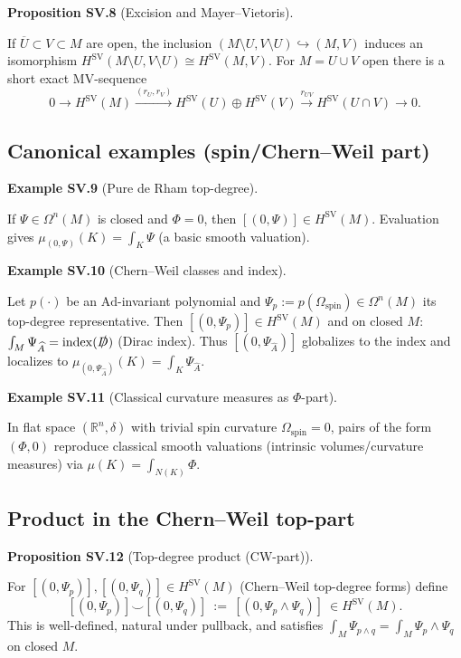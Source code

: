 \documentclass[10pt, letterpaper]{article}
\newcommand{\R}{\mathbb{R}}
\newcommand{\CustomHeading}[3]{%
  \par\medskip\noindent%
  \textbf{#1 #2} \textnormal{(#3)}.\enskip%
}
\newenvironment{PROP}[2]{\begin{unitbox}\CustomHeading{Proposition}{#1}{#2}}{\end{unitbox}}
\newenvironment{EXA}[2]{\begin{unitbox}\CustomHeading{Example}{#1}{#2}}{\end{unitbox}}
\begin{document}
\begin{PROP}{SV.8}{Excision and Mayer--Vietoris}
If $\overline U\subset V\subset M$ are open, the inclusion $(M\setminus U, V\setminus U)\hookrightarrow (M,V)$
induces an isomorphism $H^{\operatorname{SV}}(M\setminus U,V\setminus U)\cong H^{\operatorname{SV}}(M,V)$.
For $M=U\cup V$ open there is a short exact MV-sequence
\[
0\to H^{\operatorname{SV}}(M)\xrightarrow{(r_U,r_V)} H^{\operatorname{SV}}(U)\oplus H^{\operatorname{SV}}(V)\xrightarrow{r_{UV}} H^{\operatorname{SV}}(U\cap V)\to 0.
\]
\end{PROP}

\subsection{Canonical examples (spin/Chern--Weil part)}
\begin{EXA}{SV.9}{Pure de Rham top-degree}
If $\Psi\in\Omega^n(M)$ is closed and $\Phi=0$, then $[(0,\Psi)]\in H^{\operatorname{SV}}(M)$.
Evaluation gives $\mu_{(0,\Psi)}(K)=\int_K\Psi$ (a basic smooth valuation).
\end{EXA}

\begin{EXA}{SV.10}{Chern--Weil classes and index}
Let $p(\cdot)$ be an $\mathrm{Ad}$-invariant polynomial and $\Psi_p:=p(\Omega_{\mathrm{spin}})\in\Omega^n(M)$ its top-degree representative.
Then $[(0,\Psi_p)]\in H^{\operatorname{SV}}(M)$ and on closed $M$:
$\int_M \Psi_{\widehat A}=\mathrm{index}(\slashed{D})$ (Dirac index).
Thus $[(0,\Psi_{\widehat A})]$ globalizes to the index and localizes to $\mu_{(0,\Psi_{\widehat A})}(K)=\int_K \Psi_{\widehat A}$.
\end{EXA}

\begin{EXA}{SV.11}{Classical curvature measures as $\Phi$-part}
In flat space $(\R^n,\delta)$ with trivial spin curvature $\Omega_{\mathrm{spin}}=0$,
pairs of the form $(\Phi,0)$ reproduce classical smooth valuations (intrinsic volumes/curvature measures)
via $\mu(K)=\int_{N(K)}\Phi$.
\end{EXA}

\subsection{Product in the Chern--Weil top-part}
\begin{PROP}{SV.12}{Top-degree product (CW-part)}
For $[(0,\Psi_p)],[(0,\Psi_q)]\in H^{\operatorname{SV}}(M)$ (Chern--Weil top-degree forms) define
\[
[(0,\Psi_p)]\smile [(0,\Psi_q)]\ :=\ [(0,\Psi_p\wedge \Psi_q)]\ \in H^{\operatorname{SV}}(M).
\]
This is well-defined, natural under pullback, and satisfies
$\int_M \Psi_{p\wedge q}=\int_M \Psi_p\wedge \Psi_q$ on closed $M$.
\end{PROP}
\end{document}
